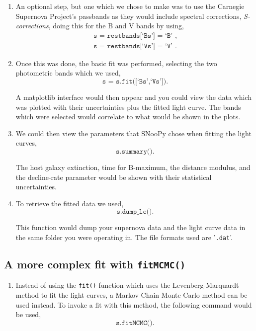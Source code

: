 \documentclass[twocolumn]{revtex4}
\begin{document}
{{{{{\begin{enumerate}
 \item An optional step, but one which we chose to make was to use the Carnegie Supernova Project's passbands as they would include spectral corrections, \textit{S-corrections}, doing this for the B and V bands by using,
 \begin{equation*}
 \begin{split}
 \texttt{s = restbands[`Bs'] = `B' } , \\ 
 \texttt{s = restbands[`Vs'] = `V' } .
 \end{split}
 \end{equation*}
 
 \item Once this was done, the basic fit was performed, selecting the two photometric bands which we used,
 \begin{equation*}
 \texttt{s = s.fit([`Bs',`Vs'])} . 
 \end{equation*}
 
 A matplotlib interface would then appear and you could view the data which was plotted with their uncertainties plus the fitted light curve. The bands which were selected would correlate to what would be shown in the plots.
 
 \item We could then view the parameters that SNooPy chose when fitting the light curves,
 \begin{equation*}
 \texttt{s.summary()} .
 \end{equation*}
 
 The host galaxy extinction, time for B-maximum, the distance modulus, and the decline-rate parameter would be shown with their statistical uncertainties.
 
 \item To retrieve the fitted data we used,
 \begin{equation*}
 \texttt{s.dump\_lc()} .
 \end{equation*}
 
 This function would dump your supernova data and the light curve data in the same folder you were operating in. The file formats used are '\texttt{.dat}'.
\end{enumerate}

\subsection{A more complex fit with \texttt{fitMCMC()}}
\begin{enumerate}
 \item Instead of using the \texttt{fit()} function which uses the Levenberg-Marquardt method to fit the light curves, a Markov Chain Monte Carlo method can be used instead. To invoke a fit with this method, the following command would be used, 
 \begin{equation*}
 \texttt{s.fitMCMC()} .
 \end{equation*}
 

\end{enumerate}}}}}}
\end{document}
